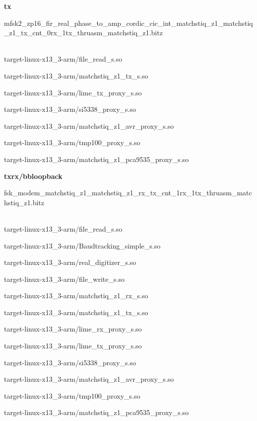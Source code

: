 	\noindent\textbf{tx}
	\begin{itemize}
	\item
mfsk2\_zp16\_fir\_real\_phase\_to\_amp\_cordic\_cic\_int\_matchstiq\_z1\_matchstiq\_z1\_tx\_cnt\_0rx\_1tx\_thruasm\_matchstiq\_z1.bitz	\\ \\
	\begin{minipage}[t]{.5\textwidth}
	\item target-linux-x13\_3-arm/file\_read\_s.so
	\item target-linux-x13\_3-arm/matchstiq\_z1\_tx\_s.so
	\item target-linux-x13\_3-arm/lime\_tx\_proxy\_s.so
	\item target-linux-x13\_3-arm/si5338\_proxy\_s.so
	\end{minipage}
	\begin{minipage}[t]{.5\textwidth}
	\item target-linux-x13\_3-arm/matchstiq\_z1\_avr\_proxy\_s.so
	\item target-linux-x13\_3-arm/tmp100\_proxy\_s.so
	\item target-linux-x13\_3-arm/matchstiq\_z1\_pca9535\_proxy\_s.so
	\end{minipage}
	\end{itemize}

	\noindent\textbf{txrx/bbloopback}
	\begin{itemize}
	\item fsk\_modem\_matchstiq\_z1\_matchstiq\_z1\_rx\_tx\_cnt\_1rx\_1tx\_thruasm\_matchstiq\_z1.bitz \\ \\
	\begin{minipage}[t]{.5\textwidth}
	\item target-linux-x13\_3-arm/file\_read\_s.so
	\item target-linux-x13\_3-arm/Baudtracking\_simple\_s.so
	\item target-linux-x13\_3-arm/real\_digitizer\_s.so
	\item target-linux-x13\_3-arm/file\_write\_s.so
	\item target-linux-x13\_3-arm/matchstiq\_z1\_rx\_s.so
	\item target-linux-x13\_3-arm/matchstiq\_z1\_tx\_s.so
	\end{minipage}
	\begin{minipage}[t]{.5\textwidth}
	\item target-linux-x13\_3-arm/lime\_rx\_proxy\_s.so
	\item target-linux-x13\_3-arm/lime\_tx\_proxy\_s.so
	\item target-linux-x13\_3-arm/si5338\_proxy\_s.so
	\item target-linux-x13\_3-arm/matchstiq\_z1\_avr\_proxy\_s.so
	\item target-linux-x13\_3-arm/tmp100\_proxy\_s.so
	\item target-linux-x13\_3-arm/matchstiq\_z1\_pca9535\_proxy\_s.so
	\end{minipage}
	\end{itemize}
\pagebreak
